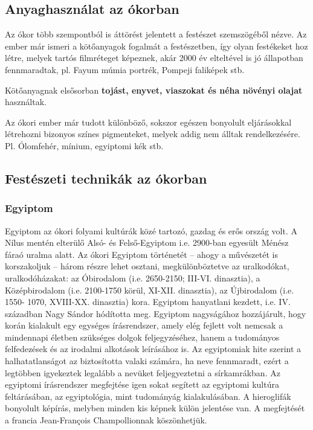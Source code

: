 \subsection*{Anyaghasználat az ókorban}

	Az ókor több szempontból is áttörést jelentett a festészet szemszögéből nézve. Az ember már ismeri a kötőanyagok fogalmát a festészetben, így olyan festékeket hoz létre, melyek tartós filmréteget képeznek, akár 2000 év elteltével is jó állapotban fennmaradtak, pl. Fayum múmia portrék, Pompeji faliképek stb. 

Kötőanyagnak elsősorban\textbf{ tojást, enyvet, viaszokat és néha növényi olajat} használtak.

Az ókori ember már tudott különböző, sokszor egészen bonyolult eljárásokkal létrehozni bizonyos színes pigmenteket, melyek addig nem álltak rendelkezésére. Pl. Ólomfehér, mínium, egyiptomi kék stb.

\subsection*{Festészeti technikák az ókorban}

\subsubsection{Egyiptom}

Egyiptom az ókori folyami kultúrák közé tartozó, gazdag és erős ország volt. A Nílus mentén
elterülő Alsó- és Felső-Egyiptom i.e. 2900-ban egyesült Ménész fáraó uralma alatt. Az ókori
Egyiptom történetét – ahogy a művészetét is korszakoljuk – három részre lehet osztani,
megkülönböztetve az uralkodókat, uralkodóházakat: az Óbirodalom (i.e. 2650-2150; III-VI.
dinasztia), a Középbirodalom (i.e. 2100-1750 körül, XI-XII. dinasztia), az Újbirodalom (i.e. 1550-
1070, XVIII-XX. dinasztia) kora. Egyiptom hanyatlani kezdett, i.e. IV. században Nagy
Sándor hódította meg.
Egyiptom nagyságához hozzájárult, hogy korán kialakult egy egységes írásrendszer, amely
elég fejlett volt nemcsak a mindennapi életben szükséges dolgok feljegyzéséhez, hanem a
tudományos felfedezések és az irodalmi alkotások leírásához is. Az egyiptomiak hite szerint a
halhatatlanságot az biztosította valaki számára, ha neve fennmaradt, ezért a legtöbben
igyekeztek legalább a nevüket feljegyeztetni a sírkamrákban.
Az egyiptomi írásrendszer megfejtése igen sokat segített az egyiptomi kultúra feltárásában, az
egyiptológia, mint tudományág kialakulásában. A hieroglifák bonyolult képírás, melyben
minden kis képnek külön jelentése van. A megfejtését a francia Jean-François Champollionnak köszönhetjük. 

